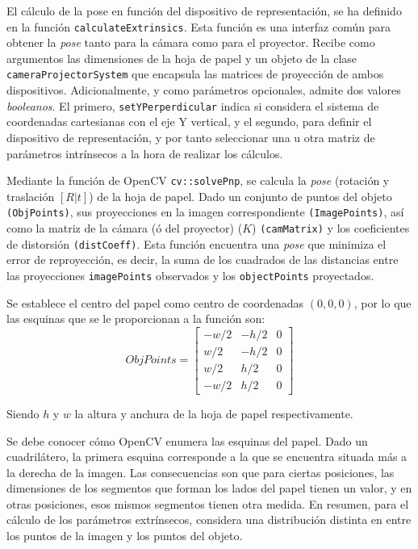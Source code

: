 El cálculo de la pose en función del dispositivo de representación, se ha definido en la función \texttt{calculateExtrinsics}. Esta función es una interfaz común para obtener la \textit{pose} tanto para la cámara como para el proyector. Recibe como argumentos las dimensiones de la hoja de papel y un objeto de la clase \texttt{cameraProjectorSystem} que encapsula las matrices de proyección de ambos dispositivos. Adicionalmente, y como parámetros opcionales, admite dos valores \textit{booleanos}. El primero, \texttt{setYPerperdicular} indica si considera el sistema de coordenadas cartesianas con el eje Y vertical, y el segundo, para definir el dispositivo de representación, y por tanto seleccionar una u otra matriz de parámetros intrínsecos a la hora de realizar los cálculos.

Mediante la función de OpenCV \texttt{cv::solvePnp}, se calcula la \emph{pose} (rotación y traslación $[R|t]$) de la hoja de papel. Dado un conjunto de puntos del objeto \texttt{(ObjPoints)}, sus proyecciones en la imagen correspondiente \texttt{(ImagePoints)}, así como la matriz de la cámara (ó del proyector) ($K$) \texttt{(camMatrix)} y los coeficientes de distorsión \texttt{(distCoeff)}. Esta función encuentra una \emph{pose} que minimiza el error de reproyección, es decir, la suma de los cuadrados de las distancias entre las proyecciones \texttt{imagePoints} observados y los \texttt{objectPoints} proyectados.

Se establece el centro del papel como centro de coordenadas $(0,0,0)$, por lo que las esquinas que se le proporcionan a la función son:
\begin{equation}
  ObjPoints =\begin{bmatrix} -w/2 & -h/2 & 0 \\
    w/2 & -h/2 & 0 \\
    w/2 &  h/2 & 0 \\
    -w/2 &  h/2 & 0
  \end{bmatrix}
\end{equation} 

Siendo $h$ y $w$ la altura y anchura de la hoja de papel respectivamente. 

Se debe conocer cómo OpenCV enumera las esquinas del papel. Dado un cuadrilátero, la primera esquina corresponde a la que se encuentra situada más a la derecha de la imagen.  Las consecuencias son que para ciertas posiciones, las dimensiones de los segmentos que forman los lados del papel tienen un valor, y en otras posiciones, esos mismos segmentos tienen otra medida. En resumen, para el cálculo de los parámetros extrínsecos, considera una distribución distinta en entre los puntos de la imagen y los puntos del objeto.

